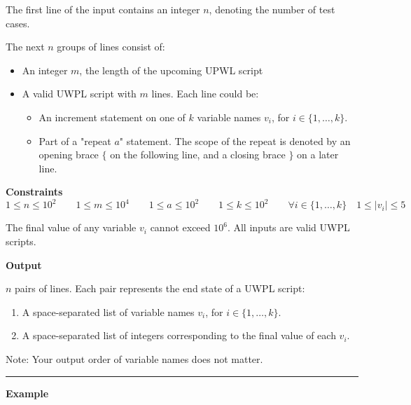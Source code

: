 The first line of the input contains an integer $n$, denoting the number of test cases.

The next $n$ groups of lines consist of:
\begin{itemize}
    \item An integer $m$, the length of the upcoming UPWL script
    \item A valid UWPL script with $m$ lines. Each line could be:
    \begin{itemize}
        \item An increment statement on one of $k$ variable names $v_i$, for $i \in \{1, \dots, k\}$.
        \item Part of a "repeat $a$" statement. 
        The scope of the repeat is denoted by an opening brace $\lbrace$ on the following line, and a closing brace $\rbrace$ on a later line.
    \end{itemize}
\end{itemize}

\textbf{Constraints}
\begin{equation*}
    1 \leq n \leq 10^2 \qquad
    1 \leq m \leq 10^4 \qquad
    1 \leq a \leq 10^2 \qquad
    1 \leq k \leq 10^2 \qquad
    \forall i \in \{1, \dots, k\} \quad 1 \leq |v_i| \leq 5
\end{equation*}

The final value of any variable $v_i$ cannot exceed $10^6$. All inputs are valid UWPL scripts.

\textbf{Output}

$n$ pairs of lines. Each pair represents the end state of a UWPL script:
\begin{enumerate}
    \item A space-separated list of variable names $v_i$, for $i \in \lbrace 1, \dots, k \rbrace$.
    \item A space-separated list of integers corresponding to the final value of each $v_i$.
\end{enumerate}

Note: Your output order of variable names does not matter.

\vspace{8pt}
\hrule

\newpage

\textbf{Example}

